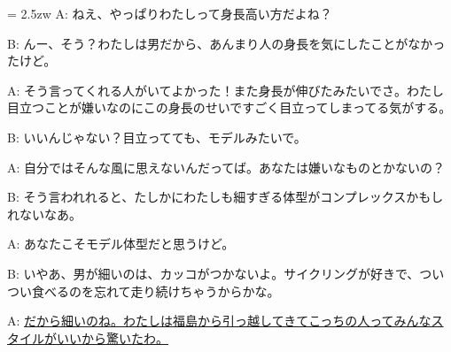 \documentclass[11pt]{amsart}
\title{}
\author{}
\newenvironment{hangall}[1]{\hangindent = 2.5zw\everypar{\hangindent = 2.5zw}}{}
\begin{document}
\maketitle
\begin{hangall}{}%
A: ねえ、やっぱりわたしって身長高い方だよね？

B: んー、そう？わたしは男だから、あんまり人の身長を気にしたことがなかったけど。

A: そう言ってくれる人がいてよかった！また身長が伸びたみたいでさ。わたし目立つことが嫌いなのにこの身長のせいですごく目立ってしまってる気がする。

B: いいんじゃない？目立ってても、モデルみたいで。

A: 自分ではそんな風に思えないんだってば。あなたは嫌いなものとかないの？

B: そう言われれると、たしかにわたしも細すぎる体型がコンプレックスかもしれないなあ。

A: あなたこそモデル体型だと思うけど。

B: いやあ、男が細いのは、カッコがつかないよ。サイクリングが好きで、ついつい食べるのを忘れて走り続けちゃうからかな。

A: \ul{だから細いのね。わたしは福島から引っ越してきてこっちの人ってみんなスタイルがいいから驚いたわ。}\end{hangall}
\end{document}
